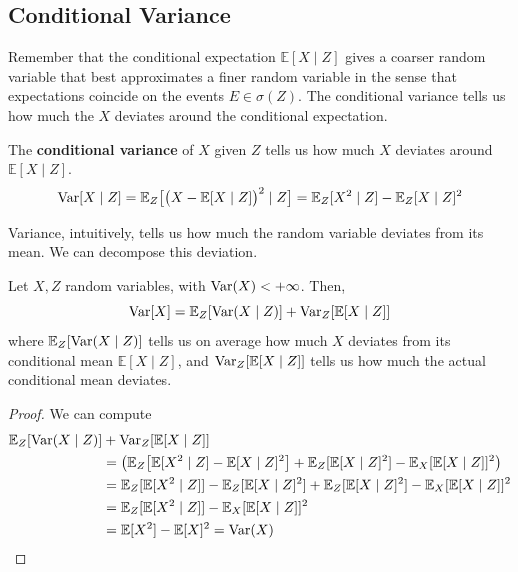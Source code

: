 \subsection{Conditional Variance}

	Remember that the conditional expectation $\mathbb{E}[X \mid Z]$ gives a coarser random variable that best approximates a finer random variable in the sense that expectations coincide on the events $E \in \sigma(Z)$. The conditional variance tells us how much the $X$ deviates around the conditional expectation. 

  \begin{definition}
    \label{def:conditional-variance}
		The \textbf{conditional variance} of $X$ given $Z$ tells us how much $X$ deviates around $\mathbb{E}[X \mid Z]$. 
    \begin{equation}
			\operatorname{Var}[X \mid Z] = \mathbb{E}_Z \big[ \big( X - \mathbb{E}[X \mid Z] \big)^2 \mid Z \big] = \mathbb{E}_Z [X^2 \mid Z] - \mathbb{E}_Z [X \mid Z]^2
    \end{equation}
  \end{definition}

	Variance, intuitively, tells us how much the random variable deviates from its mean. We can decompose this deviation. 

	\begin{theorem}
		\label{thm:law-of-total-variance}
		Let $X, Z$ random variables, with $\operatorname{Var}(X) < +\infty$. Then, 
		\begin{equation}
			\operatorname{Var}[X] = \mathbb{E}_Z [\operatorname{Var}(X \mid Z)] + \operatorname{Var}_Z [\mathbb{E}[X \mid Z]]
		\end{equation}
		where $\mathbb{E}_Z [\operatorname{Var}(X \mid Z)]$ tells us on average how much $X$ deviates from its conditional mean $\mathbb{E}[X \mid Z]$, and $\operatorname{Var}_Z [\mathbb{E}[X \mid Z]]$ tells us how much the actual conditional mean deviates. 
	\end{theorem}
	\begin{proof}
	  We can compute 
		\begin{align}
			\mathbb{E}_Z [\operatorname{Var}(X \mid Z)] & + \operatorname{Var}_Z [\mathbb{E}[X \mid Z]] \\
			  & = \big(\mathbb{E}_Z \big[ \mathbb{E}[X^2 \mid Z] - \mathbb{E}[X \mid Z]^2 \big] + \mathbb{E}_Z [\mathbb{E}[X \mid Z]^2 ] - \mathbb{E}_X [\mathbb{E}[X \mid Z]]^2 \big) \\ 
				& = \mathbb{E}_Z [\mathbb{E}[X^2 \mid Z]] - \mathbb{E}_Z [\mathbb{E}[X \mid Z]^2 ] + \mathbb{E}_Z [\mathbb{E}[X \mid Z]^2 ] - \mathbb{E}_X [\mathbb{E}[X \mid Z]]^2 \\ 
				& = \mathbb{E}_Z [\mathbb{E}[X^2 \mid Z]] - \mathbb{E}_X [\mathbb{E}[X \mid Z]]^2  \\ 
				& = \mathbb{E}[X^2] - \mathbb{E}[X]^2 = \operatorname{Var}(X)
		\end{align}
	\end{proof}

